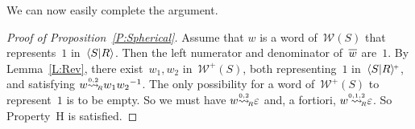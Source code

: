 \documentclass{amsart}
\numberwithin{equation}{section}
\theoremstyle{plain}
\theoremstyle{definition}
\begin{document}
We can now easily complete the argument.

\begin{proof}[Proof of Proposition~\ref{P:Spherical}]
Assume that ${w}$ is a word of~${\mathcal{W}({S})}$ that represents~$1$ in~${\langle{S}{\mid}\nobreak{R}\rangle}$. Then the left numerator and denominator of~${\overline{\vrule width0pt height5pt{w}}}$ are~$1$. By Lemma~\ref{L:Rev}, there exist~${w}_1, {w}_2$ in~${\mathcal{W}^{\scriptscriptstyle+}\!({S})}$, both representing~$1$ in~${\langle{S}{\mid}\nobreak{R}\rangle^{\!\scriptscriptstyle+}}$, and satisfying ${w} {{\mathrel{\overset{\scriptscriptstyle 0,2}{\rightsquigarrow}}}_{\hspace{-0.4ex}{\scriptscriptstyle R}}} {w}_1 {w}_2{^{-1}}$. The only possibility for a word of~${\mathcal{W}^{\scriptscriptstyle+}\!({S})}$ to represent~$1$ is to be empty. So we must have ${w} {{\mathrel{\overset{\scriptscriptstyle 0,2}{\rightsquigarrow}}}_{\hspace{-0.4ex}{\scriptscriptstyle R}}} {\varepsilon}$ and, a fortiori, ${w} {\mathrel{{\mathrel{\overset{\scriptscriptstyle 0,1,2}{\rightsquigarrow}}}_{\hspace{-0.9ex}{\scriptscriptstyle R}}}} {\varepsilon}$. So Property~${\mathrm{H}}$ is satisfied.
\end{proof}
\end{document}
